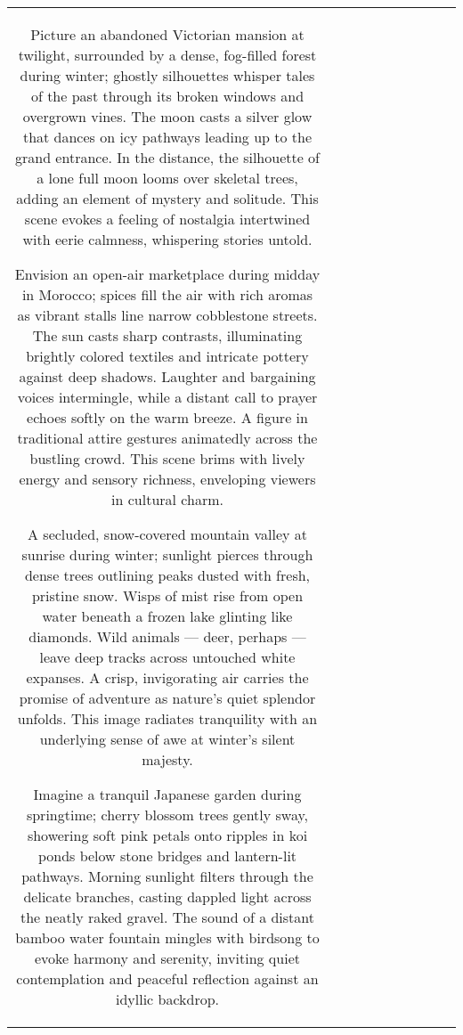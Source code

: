 \begin{table}[h!]
\begin{tabular}{|c|c|c|c|c|c|c|c|c|c|}
Picture an abandoned Victorian mansion at twilight, surrounded by a dense, fog-filled forest during winter; ghostly silhouettes whisper tales of the past through its broken windows and overgrown vines. The moon casts a silver glow that dances on icy pathways leading up to the grand entrance. In the distance, the silhouette of a lone full moon looms over skeletal trees, adding an element of mystery and solitude. This scene evokes a feeling of nostalgia intertwined with eerie calmness, whispering stories untold.

Envision an open-air marketplace during midday in Morocco; spices fill the air with rich aromas as vibrant stalls line narrow cobblestone streets. The sun casts sharp contrasts, illuminating brightly colored textiles and intricate pottery against deep shadows. Laughter and bargaining voices intermingle, while a distant call to prayer echoes softly on the warm breeze. A figure in traditional attire gestures animatedly across the bustling crowd. This scene brims with lively energy and sensory richness, enveloping viewers in cultural charm.

A secluded, snow-covered mountain valley at sunrise during winter; sunlight pierces through dense trees outlining peaks dusted with fresh, pristine snow. Wisps of mist rise from open water beneath a frozen lake glinting like diamonds. Wild animals — deer, perhaps — leave deep tracks across untouched white expanses. A crisp, invigorating air carries the promise of adventure as nature's quiet splendor unfolds. This image radiates tranquility with an underlying sense of awe at winter's silent majesty.

Imagine a tranquil Japanese garden during springtime; cherry blossom trees gently sway, showering soft pink petals onto ripples in koi ponds below stone bridges and lantern-lit pathways. Morning sunlight filters through the delicate branches, casting dappled light across the neatly raked gravel. The sound of a distant bamboo water fountain mingles with birdsong to evoke harmony and serenity, inviting quiet contemplation and peaceful reflection against an idyllic backdrop.


\end{tabular}
\end{table}
